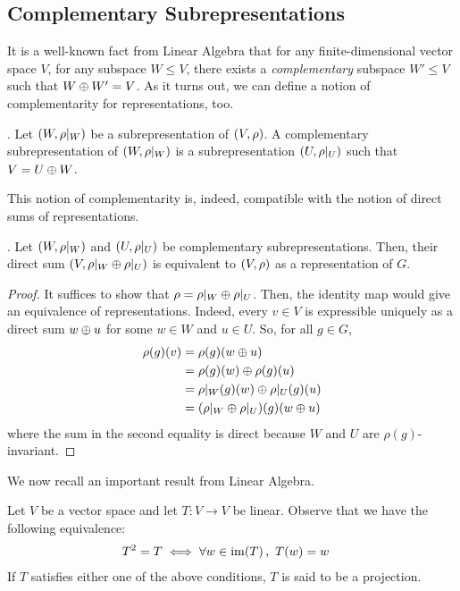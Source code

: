 \subsection{Complementary Subrepresentations}

It is a well-known fact from Linear Algebra that for any finite-dimensional vector space $V$, for any subspace $W \leq V$, there exists a \textit{complementary} subspace $W' \leq V$ such that $W \oplus W' = V$. As it turns out, we can define a notion of complementarity for representations, too.
\begin{boxdefinition}
    . Let $\left( W, \rho\vert_W \right)$ be a subrepresentation of $\left( V, \rho \right)$. A complementary subrepresentation of $\left( W, \rho\vert_W \right)$ is a subrepresentation $\left( U, \rho\vert_U \right)$ such that $V = U \oplus W$.
\end{boxdefinition}
This notion of complementarity is, indeed, compatible with the notion of direct sums of representations.
\begin{proposition}
    . Let $\left( W, \rho\vert_W \right)$ and $\left( U, \rho\vert_U \right)$ be complementary subrepresentations. Then, their direct sum $\left( V, \rho\vert_W \oplus \rho\vert_U \right)$ is equivalent to $\left( V, \rho \right)$ as a representation of $G$.
\end{proposition}
\begin{proof}
    It suffices to show that $\rho = \rho\vert_W \oplus \rho\vert_U$. Then, the identity map would give an equivalence of representations. Indeed, every $v \in V$ is expressible uniquely as a direct sum $w \oplus u$ for some $w \in W$ and $u \in U$. So, for all $g \in G$,
    \begin{align*}
        \rho(g)(v) &= \rho(g)(w \oplus u) \\
        &= \rho(g)(w) \oplus \rho(g)(u) \\
        &= \rho\vert_W(g)(w) \oplus \rho\vert_U(g)(u) \\
        &= \left( \rho\vert_W \oplus \rho\vert_U \right)\!(g)(w \oplus u)
    \end{align*}
    where the sum in the second equality is direct because $W$ and $U$ are $\rho(g)$-invariant.
\end{proof}

We now recall an important result from Linear Algebra.

\begin{definition}[Projection]
    Let $V$ be a vector space and let $T : V \to V$ be linear. Observe that we have the following equivalence:
    \begin{align}
        T^2 = T &\iff \forall w \in \operatorname{im}\!\left( T \right),\ T(w) = w \label{Ch1:Eq:Proj_Op_Equiv}
    \end{align}
    If $T$ satisfies either one of the above conditions, $T$ is said to be a projection.
\end{definition}

